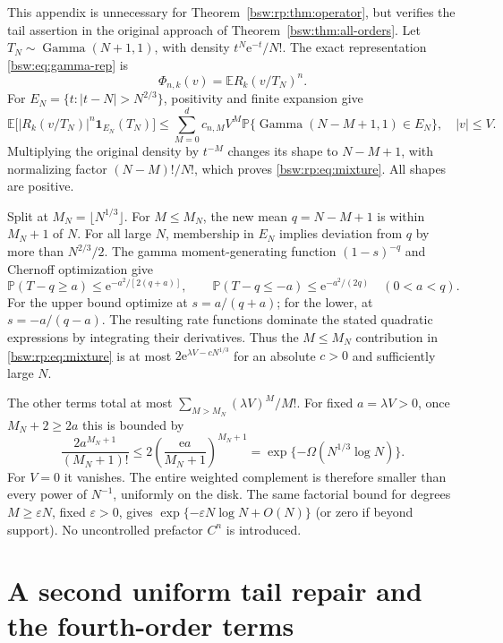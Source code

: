 \documentclass[11pt,letterpaper]{article}
\makeatletter
\theoremstyle{definition}
\theoremstyle{remark}
\newcommand{\EE}{\mathbb E}
\newcommand{\PP}{\mathbb P}
\newcommand{\ee}{\mathrm e}
\DeclareMathOperator{\GammaDist}{Gamma}
\newcommand{\bswwidertoc}{%
  \renewcommand*\l@section[2]{%
    \ifnum \c@tocdepth >\z@
      \addpenalty\@secpenalty
      \addvspace{0.3em \@plus\p@}%
      \setlength\@tempdima{3.2em}%
      \begingroup
        \parindent \z@ \rightskip \@pnumwidth
        \parfillskip -\@pnumwidth
        \leavevmode \bfseries
        \advance\leftskip\@tempdima
        \hskip -\leftskip
        ##1\nobreak\hfil
        \nobreak\hb@xt@\@pnumwidth{\hss ##2%
                                   \kern-\p@\kern\p@}\par
      \endgroup
    \fi}}
\makeatother
\begin{document}
This appendix is unnecessary for Theorem~\ref{bsw:rp:thm:operator}, but
verifies the tail assertion in the original approach of
Theorem~\ref{bsw:thm:all-orders}.  Let $T_N\sim\GammaDist(N+1,1)$, with
density $t^N\ee^{-t}/N!$.  The exact representation
\eqref{bsw:eq:gamma-rep} is
\[
 \Phi_{n,k}(v)=\EE R_k(v/T_N)^n.
\]
For $E_N=\{t:|t-N|>N^{2/3}\}$, positivity and finite expansion give
\begin{equation}\label{bsw:rp:eq:mixture}
 \EE\bigl[|R_k(v/T_N)|^n\mathbf1_{E_N}(T_N)\bigr]
 \le\sum_{M=0}^d c_{n,M}V^M
 \PP\{\GammaDist(N-M+1,1)\in E_N\},\quad |v|\le V.
\end{equation}
Multiplying the original density by $t^{-M}$ changes its shape to $N-M+1$,
with normalizing factor $(N-M)!/N!$, which proves
\eqref{bsw:rp:eq:mixture}.  All shapes are positive.

Split at $M_N=\lfloor N^{1/3}\rfloor$.  For $M\le M_N$, the new mean
$q=N-M+1$ is within $M_N+1$ of $N$.  For all large $N$, membership in $E_N$
implies deviation from $q$ by more than $N^{2/3}/2$.  The gamma
moment-generating function $(1-s)^{-q}$ and Chernoff optimization give
\[
 \PP(T-q\ge a)\le\ee^{-a^2/[2(q+a)]},\qquad
 \PP(T-q\le-a)\le\ee^{-a^2/(2q)}\quad(0<a<q).
\]
For the upper bound optimize at $s=a/(q+a)$; for the lower, at
$s=-a/(q-a)$.  The resulting rate functions dominate the stated quadratic
expressions by integrating their derivatives.  Thus the $M\le M_N$
contribution in \eqref{bsw:rp:eq:mixture} is at most
$2\ee^{\lambda V-cN^{1/3}}$ for an absolute $c>0$ and sufficiently large
$N$.

The other terms total at most $\sum_{M>M_N}(\lambda V)^M/M!$.  For fixed
$a=\lambda V>0$, once $M_N+2\ge2a$ this is bounded by
\[
 \frac{2a^{M_N+1}}{(M_N+1)!}
 \le 2\left(\frac{\ee a}{M_N+1}\right)^{M_N+1}
 =\exp\{-\Omega(N^{1/3}\log N)\}.
\]
For $V=0$ it vanishes.  The entire weighted complement is therefore smaller
than every power of $N^{-1}$, uniformly on the disk.  The same factorial
bound for degrees $M\ge\varepsilon N$, fixed $\varepsilon>0$, gives
$\exp\{-\varepsilon N\log N+O(N)\}$ (or zero if beyond support).  No
uncontrolled prefactor $C^n$ is introduced.


\clearpage
\setcounter{part}{2}
\part{A second uniform tail repair and the fourth-order terms}
\label{bsw:ut:part}
\setcounter{section}{0}
\renewcommand{\thesection}{III.\arabic{section}}
\renewcommand{\theHsection}{ut.\arabic{section}}
\addtocontents{toc}{\protect\bswwidertoc}
\end{document}
